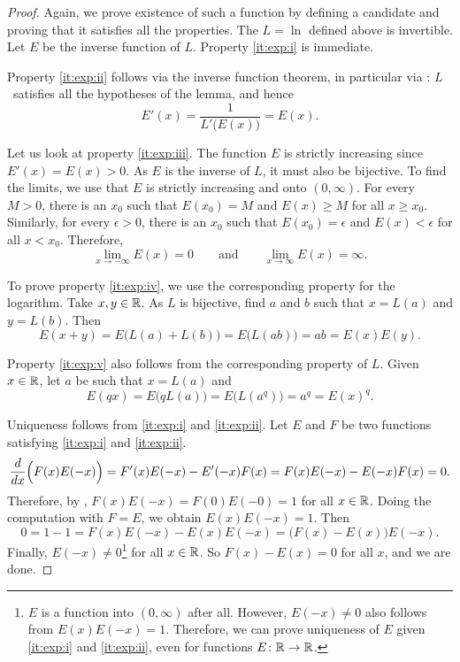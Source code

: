 \begin{proof}
Again, we prove existence of such a function by defining a candidate
and proving that it satisfies all the properties.
The $L = \ln$ defined above is invertible.  Let $E$ be the
inverse function of $L$.  Property \ref{it:exp:i} is immediate.

Property \ref{it:exp:ii} follows
via the inverse function theorem, in particular
via :  $L$~satisfies
all the hypotheses of the lemma, and hence
\begin{equation*}
E'(x) = \frac{1}{L'\bigl(E(x)\bigr)} = E(x) .
\end{equation*}

Let us look at property \ref{it:exp:iii}.
The function $E$ is strictly increasing since 
$E'(x) = E(x) > 0$.  As $E$ is the inverse of $L$, it must also
be bijective.  
To find the limits, we use that 
$E$ is strictly increasing and onto $(0,\infty)$.
For every $M > 0$, there is an $x_0$ such that
$E(x_0) = M$ and $E(x) \geq M$ for all $x \geq x_0$.
Similarly, for every $\epsilon > 0$, there is
an $x_0$ such that $E(x_0) = \epsilon$ and
$E(x) < \epsilon$ for all $x < x_0$.
Therefore,
\begin{equation*}
\lim_{x\to -\infty} E(x) = 0 \qquad \text{and} \qquad
\lim_{x\to \infty} E(x) = \infty .
\end{equation*}

To prove property \ref{it:exp:iv}, we use the corresponding
property for the logarithm.
Take $x, y \in {\mathbb{R}}$.
As $L$ is bijective, find $a$ and $b$ such that $x = L(a)$ and $y = L(b)$.  Then
\begin{equation*}
E(x+y) =
E\bigl(L(a)+L(b)\bigr) = 
E\bigl(L(ab)\bigr) = ab = E(x)E(y)  .
\end{equation*}

Property \ref{it:exp:v} also follows from the corresponding property of $L$.
Given $x \in {\mathbb{R}}$, let $a$ be such that $x = L(a)$ and
\begin{equation*}
E(qx) = E\bigl(qL(a)\bigr)
=
E\bigl(L(a^q)\bigr) = a^q = {E(x)}^q .
\end{equation*}

Uniqueness follows from
\ref{it:exp:i} and
\ref{it:exp:ii}.
Let $E$ and $F$
be two functions satisfying
\ref{it:exp:i} and \ref{it:exp:ii}.  
\begin{equation*}
\frac{d}{dx} \Bigl( F(x)E(-x) \Bigr)
=
F'(x)E(-x) - E'(-x)F(x)
=
F(x)E(-x) - E(-x)F(x) = 0 .
\end{equation*}
Therefore, by ,
$F(x)E(-x) = F(0)E(-0) = 1$ for all $x \in {\mathbb{R}}$.
Doing the computation with $F = E$,
we obtain $E(x)E(-x) = 1$.
Then
\begin{equation*}
0 = 1-1 = F(x)E(-x) - E(x)E(-x) = \bigl(F(x)-E(x)\bigr) E(-x) .
\end{equation*}
Finally, $E(-x) \neq 0$\footnote{%
$E$ is a function into $(0,\infty)$ after all.
However, $E(-x) \neq 0$ also follows
from $E(x)E(-x) = 1$.  Therefore, we can prove uniqueness of $E$ 
given \ref{it:exp:i} and \ref{it:exp:ii}, even for functions $E \colon {\mathbb{R}}
\to {\mathbb{R}}$.}
for all $x \in {\mathbb{R}}$.
So
$F(x)-E(x) = 0$ for all $x$, and we are done.
\end{proof}

